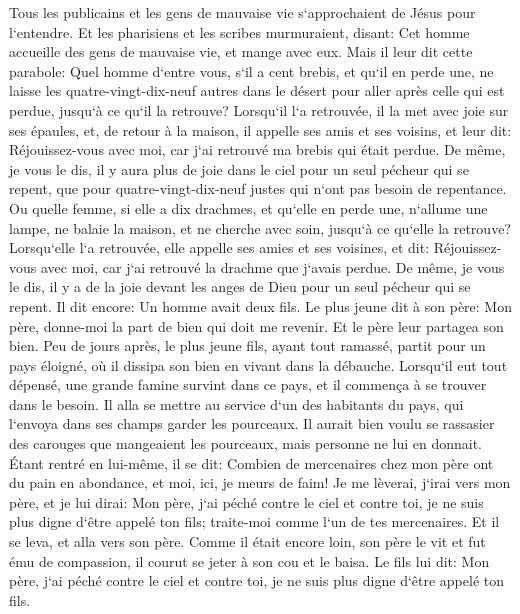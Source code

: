 \verse Tous les publicains et les gens de mauvaise vie s`approchaient de Jésus pour l`entendre. 
\verse Et les pharisiens et les scribes murmuraient, disant: Cet homme accueille des gens de mauvaise vie, et mange avec eux. 
\verse Mais il leur dit cette parabole: 
\verse Quel homme d`entre vous, s`il a cent brebis, et qu`il en perde une, ne laisse les quatre-vingt-dix-neuf autres dans le désert pour aller après celle qui est perdue, jusqu`à ce qu`il la retrouve? 
\verse Lorsqu`il l`a retrouvée, il la met avec joie sur ses épaules, 
\verse et, de retour à la maison, il appelle ses amis et ses voisins, et leur dit: Réjouissez-vous avec moi, car j`ai retrouvé ma brebis qui était perdue. 
\verse De même, je vous le dis, il y aura plus de joie dans le ciel pour un seul pécheur qui se repent, que pour quatre-vingt-dix-neuf justes qui n`ont pas besoin de repentance. 
\verse Ou quelle femme, si elle a dix drachmes, et qu`elle en perde une, n`allume une lampe, ne balaie la maison, et ne cherche avec soin, jusqu`à ce qu`elle la retrouve? 
\verse Lorsqu`elle l`a retrouvée, elle appelle ses amies et ses voisines, et dit: Réjouissez-vous avec moi, car j`ai retrouvé la drachme que j`avais perdue. 
\verse De même, je vous le dis, il y a de la joie devant les anges de Dieu pour un seul pécheur qui se repent. 
\verse Il dit encore: Un homme avait deux fils. 
\verse Le plus jeune dit à son père: Mon père, donne-moi la part de bien qui doit me revenir. Et le père leur partagea son bien. 
\verse Peu de jours après, le plus jeune fils, ayant tout ramassé, partit pour un pays éloigné, où il dissipa son bien en vivant dans la débauche. 
\verse Lorsqu`il eut tout dépensé, une grande famine survint dans ce pays, et il commença à se trouver dans le besoin. 
\verse Il alla se mettre au service d`un des habitants du pays, qui l`envoya dans ses champs garder les pourceaux. 
\verse Il aurait bien voulu se rassasier des carouges que mangeaient les pourceaux, mais personne ne lui en donnait. 
\verse Étant rentré en lui-même, il se dit: Combien de mercenaires chez mon père ont du pain en abondance, et moi, ici, je meurs de faim! 
\verse Je me lèverai, j`irai vers mon père, et je lui dirai: Mon père, j`ai péché contre le ciel et contre toi, 
\verse je ne suis plus digne d`être appelé ton fils; traite-moi comme l`un de tes mercenaires. 
\verse Et il se leva, et alla vers son père. Comme il était encore loin, son père le vit et fut ému de compassion, il courut se jeter à son cou et le baisa. 
\verse Le fils lui dit: Mon père, j`ai péché contre le ciel et contre toi, je ne suis plus digne d`être appelé ton fils. 
